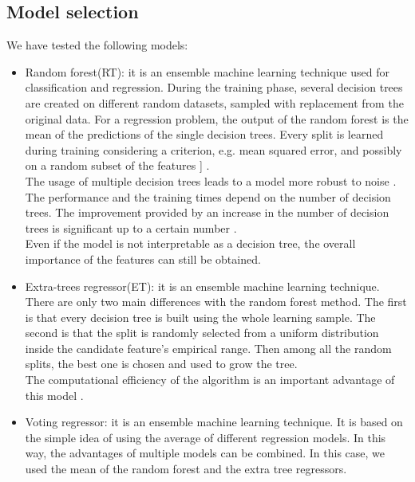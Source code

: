 \documentclass[conference]{IEEEtran}
\begin{document}
\subsection{Model selection}
We have tested the following models:
\begin{itemize}
    \item Random forest(RT): it is an ensemble machine learning technique used for classification and regression. During the training phase, several decision trees are created on different random datasets, sampled with replacement from the original data. For a regression problem, the output of the random forest is the mean of the predictions of the single decision trees. Every split is learned during training considering a criterion, e.g. mean squared error, and possibly on a random subset of the features 
\cite{randomForest}] \cite{extraTree}.\\
The usage of multiple decision trees leads to a model more robust to noise \cite{randomForest}. The performance and the training times depend on the number of decision trees. The improvement provided by an increase in the number of decision trees is significant up to a certain number \cite{limitNumTrees}.\\
Even if the model is not interpretable as a decision tree, the overall importance of the features can still be obtained.
\item Extra-trees regressor(ET): it is an ensemble machine learning technique. There are only two main differences with the random forest method. The first is that every decision tree is built using the whole learning sample. The second is that the split is randomly selected from a uniform distribution inside the candidate feature's empirical range. Then among all the random splits, the best one is chosen and used to grow the tree. \\
The computational efficiency of the algorithm is an important advantage of this model \cite{extraTree}.
\item Voting regressor: it is an ensemble machine learning technique. It is based on the simple idea of using the average of different regression models. In this way, the advantages of multiple models can be combined. In this case, we used the mean of the random forest and the extra tree regressors. %
\end{itemize}
\end{document}
